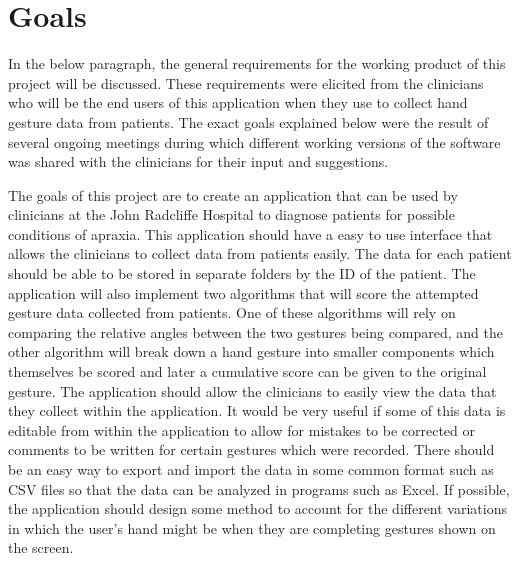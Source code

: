 \section{Goals}
In the below paragraph, the general requirements for the working product of this project will be discussed. These requirements were elicited from the clinicians who will be the end users of this application when they use to collect hand gesture data from patients. The exact goals explained below were the result of several ongoing meetings during which different working versions of the software was shared with the clinicians for their input and suggestions.

The goals of this project are to create an application that can be used by clinicians at the John Radcliffe Hospital to diagnose patients for possible conditions of apraxia. This application should have a easy to use interface that allows the clinicians to collect data from patients easily. The data for each patient should be able to be stored in separate folders by the ID of the patient. The application will also implement two algorithms that will score the attempted gesture data collected from patients. One of these algorithms will rely on comparing the relative angles between the two gestures being compared, and the other algorithm will break down a hand gesture into smaller components which themselves be scored and later a cumulative score can be given to the original gesture. The application should allow the clinicians to easily view the data that they collect within the application. It would be very useful if some of this data is editable from within the application to allow for mistakes to be corrected or comments to be written for certain gestures which were recorded. There should be an easy way to export and import the data in some common format such as CSV files so that the data can be analyzed in programs such as Excel. If possible, the application should design some method to account for the different variations in which the user's hand might be when they are completing gestures shown on the screen. 


